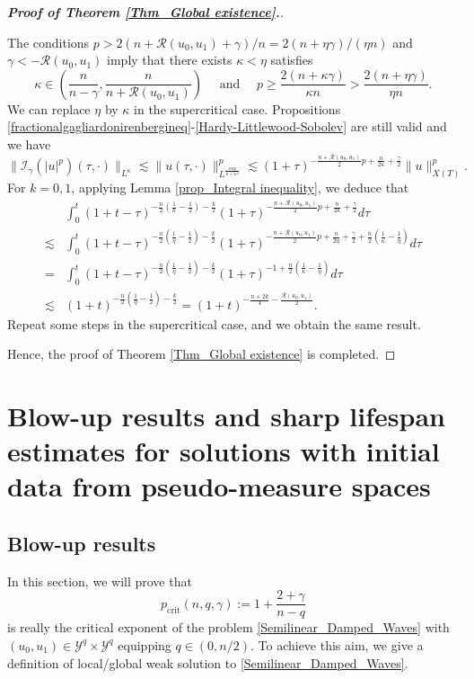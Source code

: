 \documentclass[11pt,reqno]{amsart}
\begin{document}
\begin{proof}[\textbf{Proof of Theorem \ref{Thm_Global existence}.}]
\begin{itemize}
The conditions
$
p> 2(n+\mathcal{R}(u_0, u_1)+\gamma)/ n = 2(n+\eta\gamma)/(\eta n)$ and $ \gamma<-\mathcal{R}(u_0, u_1)
$
imply that there exists $\kappa<\eta$ satisfies $$\kappa\in \left(\frac{n}{n-\gamma},\frac{n}{n+\mathcal{R}(u_0, u_1)}\right) \quad\text{ and }\quad p\geq \frac{2(n+\kappa \gamma)}{\kappa n}>\frac{2(n+\eta \gamma)}{\eta n}.$$  We can replace $\eta $ by $\kappa$ in the supercritical case. Propositions \ref{fractionalgagliardonirenbergineq}-\ref{Hardy-Littlewood-Sobolev} are still valid and we have
$$
\|\mathcal{I}_{\gamma}(|u|^{p})(\tau,\cdot)\|_{L^{\kappa}}\lesssim \|u(\tau,\cdot)\|^p_{L^{\frac{\kappa np}{n+\kappa\gamma}}}\lesssim (1+\tau)^{-\frac{n+\mathcal{R}(u_0, u_1)}{2}p+\frac{n}{2\kappa}+\frac{\gamma}{2}}\|u\|^{p}_{X(T)}.
$$
For $k = 0,1$, applying Lemma \ref{prop_Integral inequality}, we deduce that 
\begin{align*}
&\int_{0}^{t}(1+t-\tau)^{-\frac{n}{2}(\frac{1}{\kappa}-\frac{1}{2})-\frac{k}{2}}(1+\tau)^{-\frac{n+\mathcal{R}(u_0, u_1)}{2}p+\frac{n}{2\kappa}+\frac{\gamma}{2}}d\tau \\
\lesssim&\int_{0}^{t}(1+t-\tau)^{-\frac{n}{2}(\frac{1}{\eta}-\frac{1}{2})-\frac{k}{2}}(1+\tau)^{-\frac{n+\mathcal{R}(u_0, u_1)}{2}p+\frac{n}{2\eta}+\frac{\gamma}{2}+\frac{n}{2}(\frac{1}{\kappa}-\frac{1}{\eta})}d\tau\\
=&\int_{0}^{t}(1+t-\tau)^{-\frac{n}{2}(\frac{1}{\eta}-\frac{1}{2})-\frac{k}{2}}(1+\tau)^{-1+\frac{n}{2}(\frac{1}{\kappa}-\frac{1}{\eta})}d\tau\\
\lesssim & (1+t)^{-\frac{n}{2}(\frac{1}{\eta}-\frac{1}{2})-\frac{k}{2}}=(1+t)^{-\frac{n+2k}{4}-\frac{\mathcal{R}(u_0, u_1)}{2}}.
\end{align*}
Repeat some steps in the supercritical case, and we obtain the same result. 
\end{itemize}
Hence, the proof of Theorem \ref{Thm_Global existence} is completed.
\end{proof}

\section{Blow-up results and sharp lifespan estimates for solutions with initial data from pseudo-measure spaces}\label{Section_Blow-up}

\subsection{Blow-up results}
In this section, we will prove that $$p_{\text{crit}}(n,q,\gamma):=1+\frac{2+\gamma}{n-q}$$ is really the critical exponent of the problem \eqref{Semilinear_Damped_Waves} with $(u_0,u_1)\in \mathcal{Y}^q\times \mathcal{Y}^q$ equipping $q \in (0, n/2)$. To achieve this aim, we give a definition of local/global weak solution to \eqref{Semilinear_Damped_Waves}.
\end{document}
